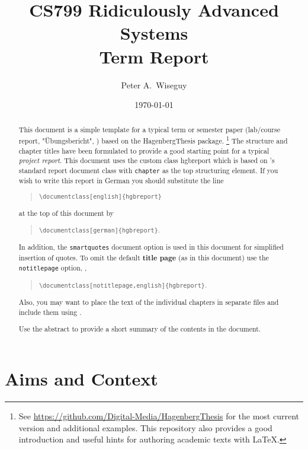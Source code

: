 \documentclass[notitlepage,english,smartquotes]{hgbreport}
\author{Peter A.\ Wiseguy}										%
\title{CS799 Ridiculously Advanced Systems\\	%
			Term Report}	%
\date{\today}
\begin{document}

\maketitle

\begin{abstract}\noindent
This document is a simple template for a typical term or semester paper (lab/course report, 
"Übungsbericht", \etc) based on the \textsf{HagenbergThesis} \latex package.%
\footnote{See \url{https://github.com/Digital-Media/HagenbergThesis} for the most current version
and additional examples.
This repository also provides a good introduction and useful hints for authoring academic texts with LaTeX.}
The structure and chapter titles have been formulated to provide a good starting point
for a typical \emph{project report}.
This document uses the custom class \textsf{hgbreport} which is based on \latex's standard \textsf{report} 
document class with \texttt{chapter} as the top structuring element. 
If you wish to write this report in German you should substitute the line
\begin{quote}
	\verb!\documentclass[english]{hgbreport}! 
\end{quote}
at the top of this document by
\begin{quote}
	\verb!\documentclass[german]{hgbreport}!.
\end{quote}
In addition, the \texttt{smartquotes} document option is used in this document for simplified insertion of quotes.
To omit the default \textbf{title page} (as in this document) use the \texttt{notitlepage} option, \eg,
\begin{quote}
	\verb!\documentclass[notitlepage,english]{hgbreport}!.
\end{quote}
Also, you may want to place the text of the individual chapters in separate files and 
include them using \verb!!.

\bigskip
\noindent
Use the abstract to provide a short summary of the contents in the document.
\end{abstract}


\tableofcontents



\chapter{Aims and Context}
\end{document}
